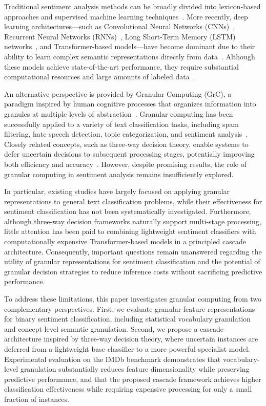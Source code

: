 \documentclass[a4paper,fleqn]{cas-dc}
\begin{document}
Traditional sentiment analysis methods can be broadly divided into lexicon-based approaches and supervised machine learning techniques~\cite{azzeddine2018sentiment, sharma2025review}. More recently, deep learning architectures---such as Convolutional Neural Networks (CNNs)~\cite{id:Xie2023Convolutional}, Recurrent Neural Networks (RNNs)~\cite{id:Nursal2025Battle}, Long Short-Term Memory (LSTM) networks~\cite{id:Kilic2026Hybrid,id:Tan2022RoBERTa}, and Transformer-based models---have become dominant due to their ability to learn complex semantic representations directly from data~\cite{ain2017sentiment, sharma2025review}. Although these models achieve state-of-the-art performance, they require substantial computational resources and large amounts of labeled data~\cite{Li2017deep, strubell2019energy}.

An alternative perspective is provided by Granular Computing (GrC), a paradigm inspired by human cognitive processes that organizes information into granules at multiple levels of abstraction~\cite{bargiela2003granular, Zadeh1997GrC}. Granular computing has been successfully applied to a variety of text classification tasks, including spam filtering, hate speech detection, topic categorization, and sentiment analysis~\cite{Behzadidoost2024GrC, Liu2017fuzzy, Yang2022temporal}. Closely related concepts, such as three-way decision theory, enable systems to defer uncertain decisions to subsequent processing stages, potentially improving both efficiency and accuracy~\cite{Fujita2016threeway, Yao2018threeway}. However, despite promising results, the role of granular computing in sentiment analysis remains insufficiently explored.

In particular, existing studies have largely focused on applying granular representations to general text classification problems, while their effectiveness for sentiment classification has not been systematically investigated. Furthermore, although three-way decision frameworks naturally support multi-stage processing, little attention has been paid to combining lightweight sentiment classifiers with computationally expensive Transformer-based models in a principled cascade architecture. Consequently, important questions remain unanswered regarding the utility of granular representations for sentiment classification and the potential of granular decision strategies to reduce inference costs without sacrificing predictive performance.

To address these limitations, this paper investigates granular computing from two complementary perspectives. First, we evaluate granular feature representations for binary sentiment classification, including statistical vocabulary granulation and concept-level semantic granulation. Second, we propose a cascade architecture inspired by three-way decision theory, where uncertain instances are deferred from a lightweight base classifier to a more powerful specialist model. Experimental evaluation on the IMDb benchmark demonstrates that vocabulary-level granulation substantially reduces feature dimensionality while preserving predictive performance, and that the proposed cascade framework achieves higher classification effectiveness while requiring expensive processing for only a small fraction of instances.
\end{document}
